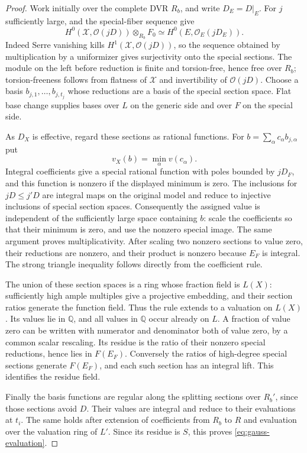 \begin{proof}
Work initially over the complete DVR $R_b$, and write $D_E=D|_E$.
For $j$ sufficiently large,
 and the special-fiber sequence give
\[
 H^0(\mathcal X,\mathcal O(jD))\otimes_{R_b}F_0
 \simeq H^0(E,\mathcal O_E(jD_E)).
\]
Indeed Serre vanishing kills $H^1(\mathcal X,\mathcal O(jD))$, so the
sequence obtained by multiplication by a uniformizer gives surjectivity
onto the special sections. The module on the left before reduction is
finite and torsion-free, hence free over $R_b$; torsion-freeness follows
from flatness of $\mathcal X$ and invertibility of $\mathcal O(jD)$.
Choose a basis $b_{j,1},\ldots,b_{j,t_j}$ whose reductions are a basis
of the special section space. Flat base change supplies bases over $L$
on the generic side and over $F$ on the special side.

As $D_X$ is effective, regard these sections as rational functions.
For $b=\sum_\alpha c_\alpha b_{j,\alpha}$ put
\[
 v_X(b)=\min_\alpha v(c_\alpha).
\]
Integral coefficients give a special rational function with poles
bounded by $jD_F$, and this function is nonzero if the displayed minimum
is zero. The inclusions for $jD\leq j'D$ are integral maps on the original
model and reduce to injective inclusions of special section spaces.
Consequently the assigned value is independent of the sufficiently
large space containing $b$: scale the coefficients so that their minimum
is zero, and use the nonzero special image. The same argument proves
multiplicativity. After scaling two nonzero sections to value zero, their
reductions are nonzero, and their product is nonzero because $E_F$ is
integral. The strong triangle inequality follows directly from the
coefficient rule.

The union of these section spaces is a ring whose fraction field is
$L(X)$: sufficiently high ample multiples give a projective embedding,
and their section ratios generate the function field. Thus the rule
extends to a valuation on $L(X)$. Its values lie in $\mathbb Q$, and all
values in $\mathbb Q$ occur already on $L$. A fraction of value zero can
be written with numerator and denominator both of value zero, by a
common scalar rescaling. Its residue is the ratio of their nonzero
special reductions, hence lies in $F(E_F)$. Conversely the ratios of
high-degree special sections generate $F(E_F)$, and each such section
has an integral lift. This identifies the residue field.

Finally the basis functions are regular along the splitting sections
over $R_b'$, since those sections avoid $D$. Their values are integral
and reduce to their evaluations at $t_i$. The same holds after extension
of coefficients from $R_b$ to $R$ and evaluation over the valuation ring
of $L'$. Since its residue is $S$, this proves
\eqref{eq:gauss-evaluation}.
\end{proof}

